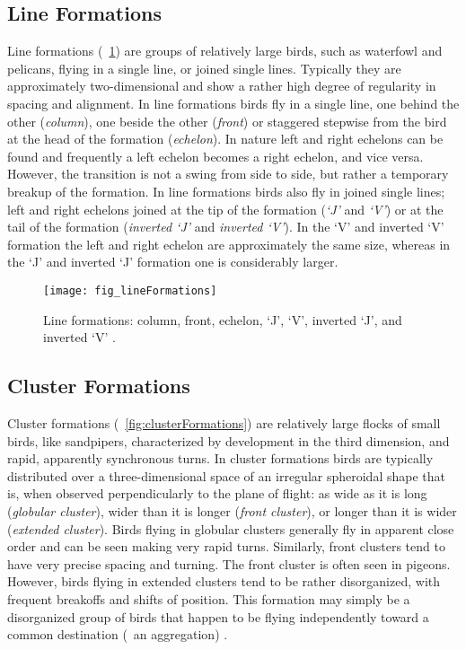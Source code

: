 \subsection{Line Formations}
Line formations (\fig~\ref{fig:lineFormations}) are groups of relatively large birds, such as waterfowl and pelicans, flying in a single line, or joined single lines. Typically they are approximately two-dimensional and show a rather high degree of regularity in spacing and alignment. In line formations birds fly in a single line, one behind the other (\emph{column}), one beside the other (\emph{front}) or staggered stepwise from the bird at the head of the formation (\emph{echelon}). In nature left and right echelons can be found and frequently a left echelon becomes a right echelon, and vice versa. However, the transition is not a swing from side to side, but rather a temporary breakup of the formation. In line formations birds also fly in joined single lines; left and right echelons joined at the tip of the formation (\emph{`J'} and \emph{`V'}) or at the tail of the formation (\emph{inverted `J'} and \emph{inverted `V'}). In the `V' and inverted `V' formation the left and right echelon are approximately the same size, whereas in the `J' and inverted `J' formation one is considerably larger.

\begin{figure}
	\texttt{[image: fig\_lineFormations]}
	\caption{Line formations: column, front, echelon, `J', `V', inverted `J', and inverted `V' \cite{heppner:1974a}.}
	\label{fig:lineFormations}
\end{figure}

\subsection{Cluster Formations}
Cluster formations (\fig~\ref{fig:clusterFormations}) are relatively large flocks of small birds, like sandpipers, characterized by development in the third dimension, and rapid, apparently synchronous turns. In cluster formations birds are typically distributed over a three-dimensional space of an irregular spheroidal shape that is, when observed perpendicularly to the plane of flight: as wide as it is long (\emph{globular cluster}), wider than it is longer (\emph{front cluster}), or longer than it is wider (\emph{extended cluster}). Birds flying in globular clusters generally fly in apparent close order and can be seen making very rapid turns. Similarly, front clusters tend to have very precise spacing and turning. The front cluster is often seen in pigeons. However, birds flying in extended clusters tend to be rather disorganized, with frequent breakoffs and shifts of position. This formation may simply be a disorganized group of birds that happen to be flying independently toward a common destination (\ie\ an aggregation) \cite{heppner:1974a}.

